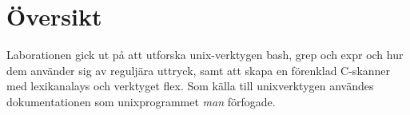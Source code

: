 \section{Översikt}
Laborationen gick ut på att utforska unix-verktygen bash, grep och expr och hur dem använder sig av reguljära uttryck, samt att skapa en förenklad C-skanner med lexikanalays och verktyget flex. 
Som källa till unixverktygen användes dokumentationen som unixprogrammet \emph{man} förfogade.
